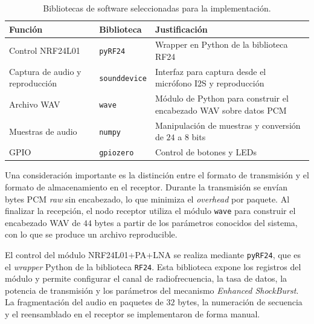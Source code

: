 \begin{table}[htb]
    \centering
    \caption{Bibliotecas de software seleccionadas para la implementación.}
    \label{tab:bibliotecas}
    \begin{tabular}{@{}p{3.5cm}lp{4.5cm}@{}}
        \toprule
        Función & Biblioteca & Justificación \\
        \midrule
        Control NRF24L01    & \texttt{pyRF24} \mbox{\cite{nrf24_pyrf24}}   & Wrapper en Python de la biblioteca RF24 \\
        Captura de audio y reproducción & \texttt{sounddevice} \mbox{\cite{spatialaudio_sounddevice}} & Interfaz para captura desde el micrófono I2S y reproducción \\
        Archivo WAV         & \texttt{wave} \mbox{\cite{python_wave}}    & Módulo de Python para construir el encabezado WAV sobre datos PCM \\
        Muestras de audio   & \texttt{numpy} \mbox{\cite{numpy2025}}  & Manipulación de muestras y conversión de $24$ a $8$ bits \\
        GPIO                & \texttt{gpiozero} \mbox{\cite{gpiozero}} & Control de botones y LEDs \\
        \bottomrule
    \end{tabular}
\end{table}

Una consideración importante es la distinción entre el formato de transmisión y el formato de almacenamiento en el receptor.
Durante la transmisión se envían bytes PCM \textit{raw} sin encabezado, lo que minimiza el \textit{overhead} por paquete.
Al finalizar la recepción, el nodo receptor utiliza el módulo \texttt{wave} para construir el encabezado WAV de $44$ bytes a partir de los parámetros conocidos del sistema, con lo que se produce un archivo reproducible.

El control del módulo NRF24L01+PA+LNA se realiza mediante \texttt{pyRF24}, que es el \textit{wrapper} Python de la biblioteca \texttt{RF24}.
Esta biblioteca expone los registros del módulo y permite configurar el canal de radiofrecuencia, la tasa de datos, la potencia de transmisión y los parámetros del mecanismo \textit{Enhanced ShockBurst}.
La fragmentación del audio en paquetes de $32$ bytes, la numeración de secuencia y el reensamblado en el receptor se implementaron de forma manual.